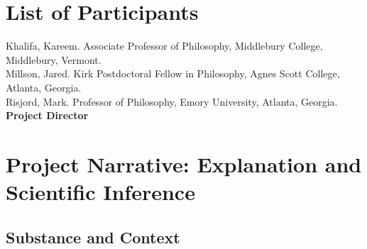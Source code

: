 \documentclass{article}[11pt]
\begin{document}
\clearpage


\section{List of Participants}

\noindent Khalifa, Kareem. Associate Professor of Philosophy, Middlebury College, Middlebury, Vermont.  \\[12pt]

\noindent Millson, Jared. Kirk Postdoctoral Fellow in Philosophy, Agnes Scott College, Atlanta, Georgia.  \\[12pt]

\noindent Risjord, Mark. Professor of Philosophy, Emory University, Atlanta, Georgia. \textbf{Project Director}  

\clearpage



\section{Project Narrative: Explanation and Scientific Inference}

\subsection{Substance and Context}
\end{document}

